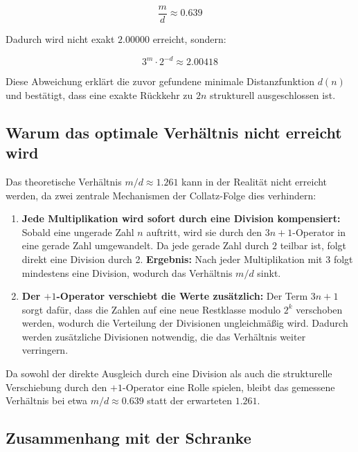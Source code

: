 \documentclass[a4paper,12pt]{article}
\begin{document}
\begin{equation}
    \frac{m}{d} \approx 0.639
\end{equation}

Dadurch wird nicht exakt \( 2.00000 \) erreicht, sondern:

\begin{equation}
    3^m \cdot 2^{-d} \approx 2.00418
\end{equation}

Diese Abweichung erklärt die zuvor gefundene minimale Distanzfunktion \( d(n) \) und bestätigt, dass eine exakte Rückkehr zu \( 2n \) strukturell ausgeschlossen ist.  

\subsection{Warum das optimale Verhältnis nicht erreicht wird}  

Das theoretische Verhältnis \( m/d \approx 1.261 \) kann in der Realität nicht erreicht werden, da zwei zentrale Mechanismen der Collatz-Folge dies verhindern:

\begin{enumerate}
    \item \textbf{Jede Multiplikation wird sofort durch eine Division kompensiert:}  
    Sobald eine ungerade Zahl \( n \) auftritt, wird sie durch den \( 3n+1 \)-Operator in eine gerade Zahl umgewandelt. Da jede gerade Zahl durch \( 2 \) teilbar ist, folgt direkt eine Division durch 2.  
    \textbf{Ergebnis:} Nach jeder Multiplikation mit 3 folgt mindestens eine Division, wodurch das Verhältnis \( m/d \) sinkt.

    \item \textbf{Der \( +1 \)-Operator verschiebt die Werte zusätzlich:}  
    Der Term \( 3n+1 \) sorgt dafür, dass die Zahlen auf eine neue Restklasse modulo \( 2^k \) verschoben werden, wodurch die Verteilung der Divisionen ungleichmäßig wird. Dadurch werden zusätzliche Divisionen notwendig, die das Verhältnis weiter verringern.
\end{enumerate}

Da sowohl der direkte Ausgleich durch eine Division als auch die strukturelle Verschiebung durch den \( +1 \)-Operator eine Rolle spielen, bleibt das gemessene Verhältnis bei etwa \( m/d \approx 0.639 \) statt der erwarteten \( 1.261 \).  

\subsection{Zusammenhang mit der Schranke}  
\end{document}
